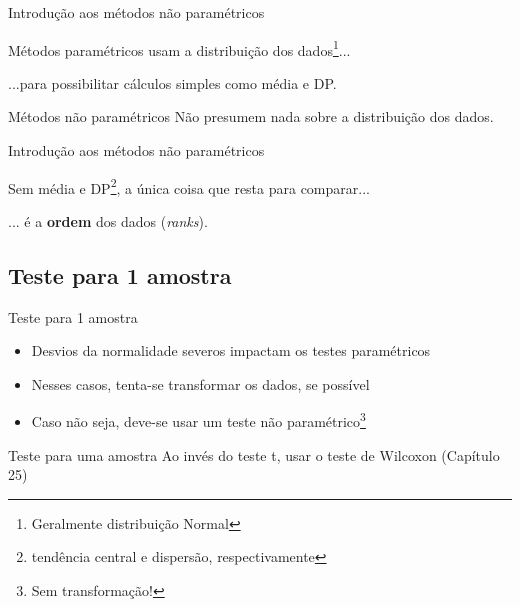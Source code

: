\documentclass{beamer}
\begin{document}
\begin{frame}{\scriptsize Introdução aos métodos não paramétricos}
  \begin{block}{Métodos paramétricos}
    \footnotesize
    usam a distribuição dos dados\footnote{\tiny Geralmente distribuição Normal}...

    \bigskip
    ...para possibilitar cálculos simples como média e DP.
  \end{block}
  \bigskip
  \bigskip
  \bigskip
  \begin{block}{Métodos não paramétricos}
    \footnotesize
    Não presumem nada sobre a distribuição dos dados.
  \end{block}
\end{frame}

\begin{frame}{\scriptsize Introdução aos métodos não paramétricos}
  \begin{center}
    Sem média e DP\footnote{\tiny tendência central e dispersão, respectivamente}, a única coisa que resta para comparar...

    \bigskip
    ... é a {\bf ordem} dos dados ({\em ranks}).
  \end{center}
\end{frame}

\subsection[1 amostra]{Teste para 1 amostra}

\begin{frame}{\scriptsize Teste para 1 amostra}
  \begin{itemize}
    \footnotesize
  \item Desvios da normalidade severos impactam os testes paramétricos
    \bigskip
  \item Nesses casos, tenta-se transformar os dados, se possível
  \item Caso não seja, deve-se usar um teste não paramétrico\footnote{\tiny Sem transformação!}
  \end{itemize}
  \bigskip
  \begin{block}{Teste para uma amostra}
    \footnotesize
    Ao invés do teste t, usar o teste de Wilcoxon {\footnotesize (Capítulo 25)}
  \end{block}
\end{frame}
\end{document}
